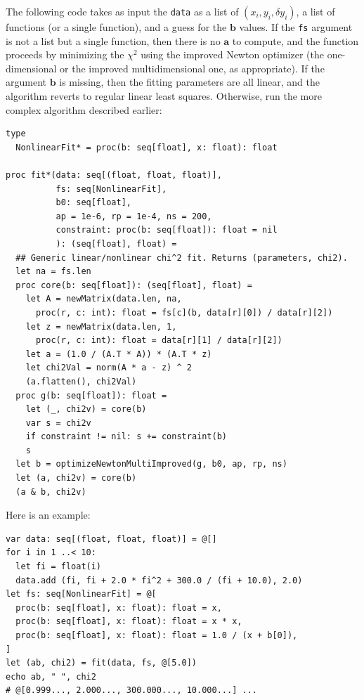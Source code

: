 \documentclass[justified, sixbynine]{tufte-book}
\def\ft{\small\tt}
\theoremstyle{plain}%
\newtheorem * {corollary}{Corollary}
\theoremstyle{definition}
\theoremstyle{remark}
\newtheorem * {remark}{Remark}
\newtheorem * {note}{Note}
\begin{document}
\begin{fullwidth}
The following code takes as input the {\ft data} as a list of $(x_i, y_i, \delta y_i)$, a list of functions (or a single function), and a guess for the $\mathbf{b}$ values. If the {\ft fs} argument is not a list but a single function, then there is no $\mathbf{a}$ to compute, and the function proceeds by minimizing the $\chi^2$ using the improved Newton optimizer (the one-dimensional or the improved multidimensional one, as appropriate). If the argument $\mathbf{b}$ is missing, then the fitting parameters are all linear, and the algorithm reverts to regular linear least squares. Otherwise, run the more complex algorithm described earlier:

\begin{lstlisting}[caption={in file: {\ft nlib.nim}}]
type
  NonlinearFit* = proc(b: seq[float], x: float): float

proc fit*(data: seq[(float, float, float)],
          fs: seq[NonlinearFit],
          b0: seq[float],
          ap = 1e-6, rp = 1e-4, ns = 200,
          constraint: proc(b: seq[float]): float = nil
          ): (seq[float], float) =
  ## Generic linear/nonlinear chi^2 fit. Returns (parameters, chi2).
  let na = fs.len
  proc core(b: seq[float]): (seq[float], float) =
    let A = newMatrix(data.len, na,
      proc(r, c: int): float = fs[c](b, data[r][0]) / data[r][2])
    let z = newMatrix(data.len, 1,
      proc(r, c: int): float = data[r][1] / data[r][2])
    let a = (1.0 / (A.T * A)) * (A.T * z)
    let chi2Val = norm(A * a - z) ^ 2
    (a.flatten(), chi2Val)
  proc g(b: seq[float]): float =
    let (_, chi2v) = core(b)
    var s = chi2v
    if constraint != nil: s += constraint(b)
    s
  let b = optimizeNewtonMultiImproved(g, b0, ap, rp, ns)
  let (a, chi2v) = core(b)
  (a & b, chi2v)
\end{lstlisting}

Here is an example:

\begin{lstlisting}
var data: seq[(float, float, float)] = @[]
for i in 1 ..< 10:
  let fi = float(i)
  data.add (fi, fi + 2.0 * fi^2 + 300.0 / (fi + 10.0), 2.0)
let fs: seq[NonlinearFit] = @[
  proc(b: seq[float], x: float): float = x,
  proc(b: seq[float], x: float): float = x * x,
  proc(b: seq[float], x: float): float = 1.0 / (x + b[0]),
]
let (ab, chi2) = fit(data, fs, @[5.0])
echo ab, " ", chi2
# @[0.999..., 2.000..., 300.000..., 10.000...] ...
\end{lstlisting}



\end{fullwidth}
\end{document}
